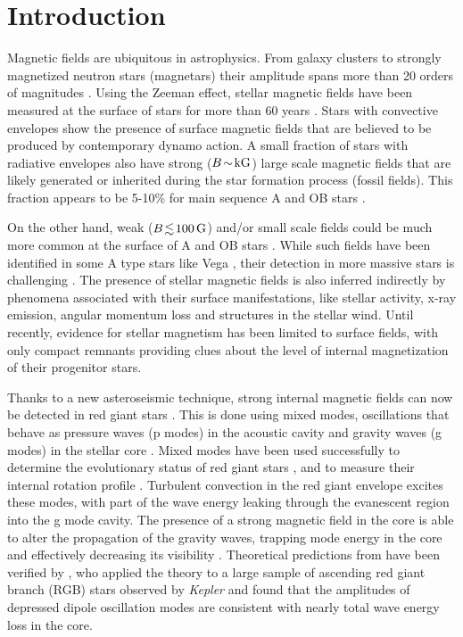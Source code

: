 
\section{Introduction}\label{intro}
Magnetic fields are ubiquitous in astrophysics. From  galaxy clusters to strongly magnetized neutron stars (magnetars) their amplitude spans more than 20 orders of magnitudes \citep{Brandenburg_2005}. Using the Zeeman effect, stellar magnetic fields have been measured at the surface of stars
for more than 60 years \citep{Babcock_1947,Landstreet_1992,Donati_2009}. Stars with convective envelopes show the presence of surface magnetic fields that are believed to be produced by contemporary dynamo action. A small fraction of stars with radiative envelopes also have strong ($B \! \sim \! {\rm kG}$) large scale magnetic fields that are likely generated or inherited during the star formation process (fossil fields). This fraction appears to be 5-10\% for main sequence A and OB stars \citep[e.g.,][]{Auriere2004,2012ASPC..464..405W}.

On the other hand, weak ($B \! \lesssim \! 100 \, {\rm G}$) and/or small scale fields could be much more common at the surface of A and OB stars \citep{Cantiello_2009,Cantiello_2011,Braithwaite_2012}. While such fields have been identified in some A type stars like Vega \citep{Lignieres2009}, their detection in more massive stars is challenging \citep{2013A&A...554A..93K}. The presence of stellar magnetic fields is also inferred indirectly by phenomena associated with their surface manifestations, like stellar activity, x-ray emission, angular momentum loss and structures in the stellar wind. Until recently, evidence for stellar magnetism has been limited to surface fields, with only compact remnants providing clues about the level of internal magnetization of their progenitor stars.

Thanks to a new asteroseismic technique, strong internal magnetic fields can now be detected in red giant stars \citep{Fuller_2015}. This is done using mixed modes, oscillations that behave as pressure waves (p modes) in the acoustic cavity and gravity waves (g modes) in the stellar core \citep{Dupret_2009}. Mixed modes have been used successfully to determine the evolutionary status of red giant stars \citep{Bedding_2011}, and to measure their internal rotation profile \citep{Beck_2011}. Turbulent convection in the red giant envelope excites these modes, with part of the wave energy leaking through the evanescent region into the g mode cavity. The presence of a strong magnetic field in the core is able to alter the propagation of the gravity waves, trapping  mode energy in the core and effectively decreasing its visibility \citep[magnetic greenhouse effect,][]{Fuller_2015}. Theoretical predictions from \citet{Fuller_2015} have been verified by \citet{Stello_2016}, who applied the theory to a large sample of ascending red giant branch (RGB) stars observed by {\it Kepler} and found that the amplitudes of depressed dipole oscillation modes are consistent with nearly total wave energy loss in the core.


